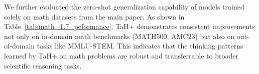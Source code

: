 We further evaluated the zero-shot generalization capability of models trained solely on math datasets from the main paper. 
As shown in Table~\ref{tab:math_1.7_peformance}, TaH+ demonstrates consistent improvements not only on in-domain math benchmarks (MATH500, AMC23) but also on out-of-domain tasks like MMLU-STEM. This indicates that the thinking patterns learned by TaH+ on math problems are robust and transferrable to broader scientific reasoning tasks.





